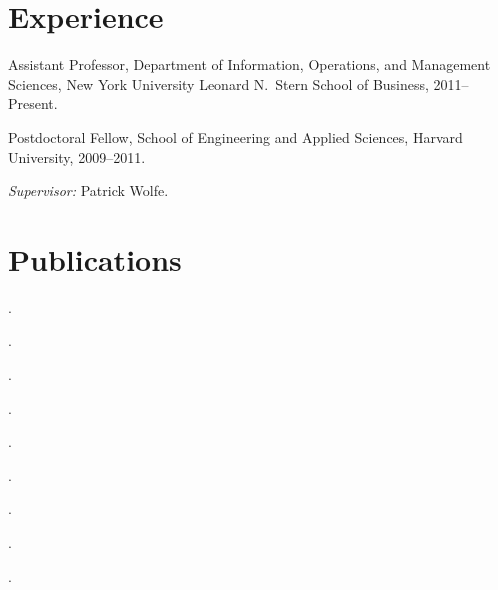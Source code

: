 \documentclass[10pt,letterpaper]{article}
\renewenvironment{itemize}{
  \begin{list}{}{
    \setlength{\leftmargin}{1.5em}
    \setlength{\itemsep}{0.25em}
    \setlength{\parskip}{0pt}
    \setlength{\parsep}{0.25em}
  }
}{
  \end{list}
}
\begin{document}
\section*{Experience}

\begin{itemize}
\item Assistant Professor, Department of Information, Operations, and
  Management Sciences, New York University Leonard N.~Stern School of Business,
  2011--Present.
\item Postdoctoral Fellow, School of Engineering and Applied Sciences, Harvard
  University, 2009--2011.
  \begin{itemize}
  \item \textit{Supervisor:} Patrick Wolfe.
  \end{itemize}
\end{itemize}






\section*{Publications}

\begin{itemize}
\item {}.
\item {}.
\item {}.
\item {}.
\item {}.
\item {}.
\item {}.
\item {}.
\item {}.
\end{itemize}
\end{document}
